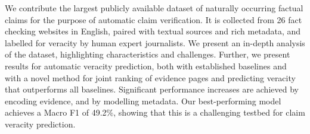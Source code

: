 We contribute the largest publicly available dataset of naturally occurring factual claims for the purpose of automatic claim verification. It is collected from 26 fact checking websites in English, paired with textual sources and rich metadata, and labelled for veracity by human expert journalists. We present an in-depth analysis of the dataset, highlighting characteristics and challenges. Further, we present results for automatic veracity prediction, both with established baselines and with a novel method for joint ranking of evidence pages and predicting veracity that outperforms all baselines. Significant performance increases are achieved by encoding evidence, and by modelling metadata. Our best-performing model achieves a Macro F1 of 49.2\%, showing that this is a challenging testbed for claim veracity prediction.